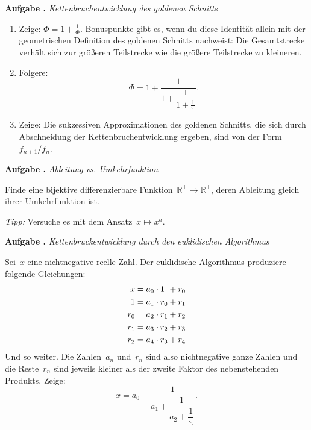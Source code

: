 \documentclass[a4paper,ngerman,twoside]{scrartcl}
\newlength{\aufgabenskip}
\newcounter{aufgabennummer}
\newenvironment{aufgabe}[1]{
  \addtocounter{aufgabennummer}{1}
  \textbf{Aufgabe \theaufgabennummer.} \emph{#1} \par
}{\vspace{\aufgabenskip}}
\newcommand{\RR}{\mathbb{R}}
\begin{document}
\begin{aufgabe}{Kettenbruchentwicklung des goldenen Schnitts}
\begin{enumerate}
\item Zeige: $\Phi = 1 + \frac{1}{\Phi}$. Bonuspunkte gibt es, wenn
du diese Identität allein mit der geometrischen Definition des goldenen
Schnitts nachweist: Die Gesamtstrecke verhält sich zur größeren Teilstrecke
wie die größere Teilstrecke zu kleineren.
\item Folgere:
\[ \Phi = 1 + \frac{1}{1 + \dfrac{1}{1 + \frac{1}{\ddots}}}. \]
\item Zeige: Die sukzessiven Approximationen des goldenen Schnitts, die sich
durch Abschneidung der Kettenbruchentwicklung ergeben, sind von der
Form~$f_{n+1}/f_n$.
\end{enumerate}
\end{aufgabe}

\begin{aufgabe}{Ableitung vs. Umkehrfunktion}
Finde eine bijektive differenzierbare Funktion~$\RR^+ \to \RR^+$, deren
Ableitung gleich ihrer Umkehrfunktion ist.

\emph{Tipp:} Versuche es mit dem Ansatz~$x \mapsto x^a$.
\end{aufgabe}

\begin{aufgabe}{Kettenbruckentwicklung durch den euklidischen Algorithmus}
Sei~$x$ eine nichtnegative reelle Zahl. Der euklidische Algorithmus produziere
folgende Gleichungen:
\begin{align*}
  x &= a_0 \cdot \sbox0{$r_0$}\makebox[\wd0][l]{$1$} + r_0 \\
  1 &= a_1 \cdot r_0 + r_1 \\
  r_0 &= a_2 \cdot r_1 + r_2 \\
  r_1 &= a_3 \cdot r_2 + r_3 \\
  r_2 &= a_4 \cdot r_3 + r_4
\end{align*}
Und so weiter. Die Zahlen~$a_n$ und~$r_n$ sind also nichtnegative ganze Zahlen
und die Reste~$r_n$ sind jeweils kleiner als der zweite Faktor des
nebenstehenden Produkts. Zeige:
\[ x = a_0 + \dfrac{1}{a_1 + \dfrac{1}{a_2 + \dfrac{1}{\ddots}}}. \]
\end{aufgabe}
\end{document}

